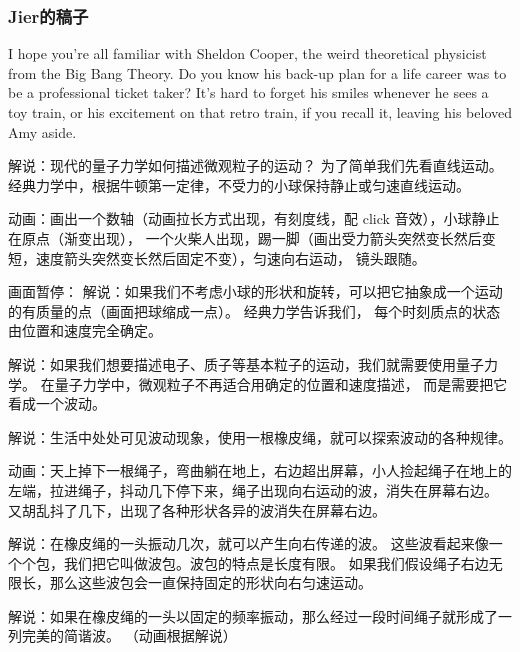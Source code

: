 
\begin{issues}
\issueDraft
\end{issues}


\subsubsection{Jier的稿子}


I hope you're all familiar with Sheldon Cooper, the weird theoretical physicist from the Big Bang Theory. Do you know his back-up plan for a life career was to be a professional ticket taker? It's hard to forget his smiles whenever he sees a toy train, or his excitement on that retro train, if you recall it, leaving his beloved Amy aside. 









解说：现代的量子力学如何描述微观粒子的运动？ 为了简单我们先看直线运动。 经典力学中，根据牛顿第一定律，不受力的小球保持静止或匀速直线运动。

动画：画出一个数轴（动画拉长方式出现，有刻度线，配 click 音效），小球静止在原点（渐变出现）， 一个火柴人出现，踢一脚（画出受力箭头突然变长然后变短，速度箭头突然变长然后固定不变），匀速向右运动， 镜头跟随。

画面暂停： 解说：如果我们不考虑小球的形状和旋转，可以把它抽象成一个运动的有质量的点（画面把球缩成一点）。 经典力学告诉我们， 每个时刻质点的状态由位置和速度完全确定。

解说：如果我们想要描述电子、质子等基本粒子的运动，我们就需要使用量子力学。 在量子力学中，微观粒子不再适合用确定的位置和速度描述， 而是需要把它看成一个波动。

解说：生活中处处可见波动现象，使用一根橡皮绳，就可以探索波动的各种规律。

动画：天上掉下一根绳子，弯曲躺在地上，右边超出屏幕，小人捡起绳子在地上的左端，拉进绳子，抖动几下停下来，绳子出现向右运动的波，消失在屏幕右边。 又胡乱抖了几下，出现了各种形状各异的波消失在屏幕右边。

解说：在橡皮绳的一头振动几次，就可以产生向右传递的波。 这些波看起来像一个个包，我们把它叫做波包。波包的特点是长度有限。 如果我们假设绳子右边无限长，那么这些波包会一直保持固定的形状向右匀速运动。

解说：如果在橡皮绳的一头以固定的频率振动，那么经过一段时间绳子就形成了一列完美的简谐波。
（动画根据解说）

